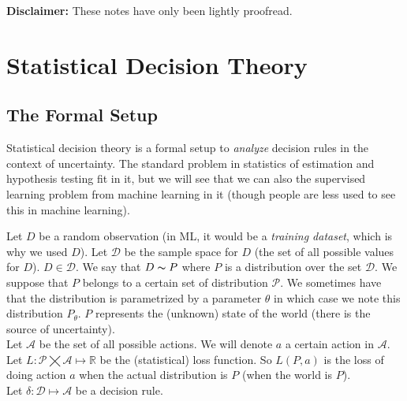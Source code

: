 \documentclass[12pt]{report}
\begin{document}
 
 

\maketitle

\textbf{Disclaimer:} These notes have only been lightly proofread.

\section{Statistical Decision Theory}

\subsection{The Formal Setup}
Statistical decision theory is a formal setup to {\it{analyze}} decision rules in the context of uncertainty. The standard problem in statistics of estimation and hypothesis testing fit in it, but we will see that we can also the supervised learning problem from machine learning in it (though people are less used to see this in machine learning).

Let $D$ be a random observation (in ML, it would be a {\it training dataset}, which is why we used $D$). Let $\mathcal{D}$ be the sample space for $D$ (the set of all possible values for $D$). $D \in \mathcal{D}$. We say that $D \thicksim P$ where $P$ is a distribution over the set $\mathcal{D}$. We suppose that $P$ belongs to a certain set of distribution $\mathcal{P}$. We sometimes have that the distribution is parametrized by a parameter $\theta$ in which case we note this distribution $P_{\theta}$. $P$ represents the (unknown) state of the world (there is the source of uncertainty). \\

\noindent Let $\mathcal{A}$ be the set of all possible actions. We will denote $a$ a certain action in $\mathcal{A}$.\\

\noindent Let $L:\mathcal{P} \bigtimes \mathcal{A} \mapsto \mathbb{R}$ be the (statistical) loss function. So $L(P,a)$ is the loss of doing action $a$ when the actual distribution is $P$ (when the world is $P$).\\

\noindent Let $\delta:\mathcal{D} \mapsto \mathcal{A}$ be a decision rule.\\
\end{document}
